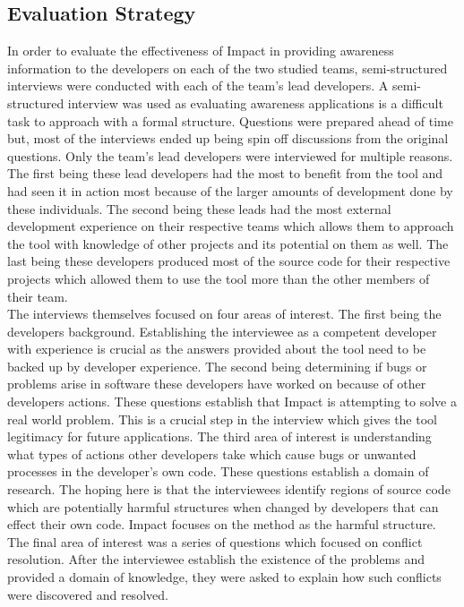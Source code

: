\documentclass[conference]{IEEEtran}
\begin{document}
\subsection{Evaluation Strategy}
In order to evaluate the effectiveness of Impact in providing awareness information to the developers
on each of the two studied teams, semi-structured interviews were conducted with each of the team's
lead developers. A semi-structured interview was used as evaluating awareness applications is a
difficult task to approach with a formal structure. Questions were prepared ahead of time but, most
of the interviews ended up being spin off discussions from the original questions. Only the team's
lead developers were interviewed for multiple reasons. The first being these lead developers had the
most to benefit from the tool and had seen it in action most because of the larger amounts of
development done by these individuals. The second being these leads had the most external development
experience on their respective teams which allows them to approach the tool with knowledge of
other projects and its potential on them as well. The last being these developers produced most of
the source code for their respective projects which allowed them to use the tool more than the 
other members of their team.  \\

The interviews themselves focused on four areas of interest. The first being the developers background.
Establishing the interviewee as a competent developer with experience is crucial as the answers
provided about the tool need to be backed up by developer experience.  The second being determining
if bugs or problems arise in software these developers have worked on because of other developers
actions. These questions establish that Impact is attempting to solve a real world problem. This
is a crucial step in the interview which gives the tool legitimacy for future applications. The third
area of interest is understanding what types of actions other developers take which cause bugs
or unwanted processes in the developer's own code. These questions establish a domain of 
research. The hoping here is that the interviewees identify regions of source code which are
potentially harmful structures when changed by developers that can effect their own code. Impact
focuses on the method as the harmful structure. The final area of interest was a series of questions
which focused on conflict resolution. After the interviewee establish the existence of the problems
and provided a domain of knowledge, they were asked to explain how such conflicts were
discovered and resolved. \\
\end{document}
